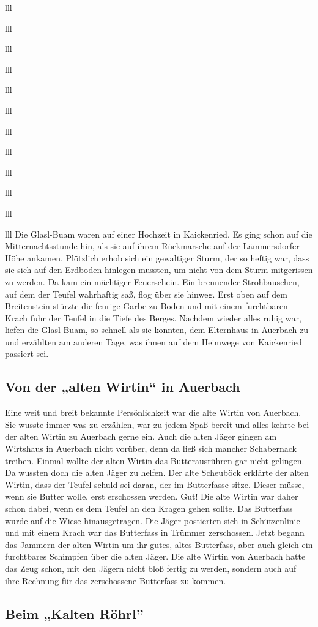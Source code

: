 \documentclass[12pt,a4pager]{book}
\begin{document}
\begin{tabuluar}{lll}
\begin{tabuluar}{lll}
\begin{tabuluar}{lll}
\begin{tabuluar}{lll}
\begin{tabuluar}{lll}
\begin{tabuluar}{lll}
\begin{tabuluar}{lll}
\begin{tabuluar}{lll}
\begin{tabuluar}{lll}
\begin{tabuluar}{lll}
\begin{tabuluar}{lll}
\begin{tabuluar}{lll}
Die Glasl-Buam waren auf einer Hochzeit in Kaickenried. Es ging schon auf die
Mitternachtsstunde hin, als sie auf ihrem Rückmarsche auf der Lämmersdorfer Höhe
ankamen. Plötzlich erhob sich ein gewaltiger Sturm, der so heftig war, dass sie
sich auf den Erdboden hinlegen mussten, um nicht von dem Sturm mitgerissen zu
werden. Da kam ein mächtiger Feuerschein. Ein brennender Strohbauschen, auf dem
der Teufel wahrhaftig saß, flog über sie hinweg. Erst oben auf dem Breitenstein
stürzte die feurige Garbe zu Boden und mit einem furchtbaren Krach fuhr der
Teufel in die Tiefe des Berges. Nachdem wieder alles ruhig war, liefen die Glasl
Buam, so schnell als sie konnten, dem Elternhaus in Auerbach zu und erzählten am
anderen Tage, was ihnen auf dem Heimwege von Kaickenried passiert sei.

\subsection{Von der „alten Wirtin“ in Auerbach}

Eine weit und breit bekannte Persönlichkeit war die alte Wirtin von Auerbach.
Sie wusste immer was zu erzählen, war zu jedem Spaß bereit und alles kehrte bei
der alten Wirtin zu Auerbach gerne ein. Auch die alten Jäger gingen am Wirtshaus
in Auerbach nicht vorüber, denn da ließ sich mancher Schabernack treiben. Einmal
wollte der alten Wirtin das Butterausrühren gar nicht gelingen. Da wussten doch
die alten Jäger zu helfen. Der alte Scheuböck erklärte der alten Wirtin, dass
der Teufel schuld sei daran, der im Butterfasse sitze. Dieser müsse, wenn sie
Butter wolle, erst erschossen werden. Gut! Die alte Wirtin war daher schon
dabei, wenn es dem Teufel an den Kragen gehen sollte. Das Butterfass wurde auf
die Wiese hinausgetragen. Die Jäger postierten sich in Schützenlinie und mit
einem Krach war das Butterfass in Trümmer zerschossen. Jetzt begann das Jammern
der alten Wirtin um ihr gutes, altes Butterfass, aber auch gleich ein
furchtbares Schimpfen über die alten Jäger. Die alte Wirtin von Auerbach hatte
das Zeug schon, mit den Jägern nicht bloß fertig zu werden, sondern auch auf
ihre Rechnung für das zerschossene Butterfass zu kommen.

\subsection{Beim „Kalten Röhrl”}


\end{tabuluar}
\end{tabuluar}
\end{tabuluar}
\end{tabuluar}
\end{tabuluar}
\end{tabuluar}
\end{tabuluar}
\end{tabuluar}
\end{tabuluar}
\end{tabuluar}
\end{tabuluar}
\end{tabuluar}
\end{document}
